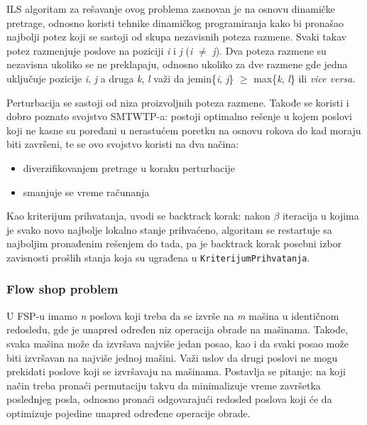 \documentclass[a4paper]{article}
\newcommand{\kriterijum}[0]{\small{\texttt{KriterijumPrihvatanja}}}
\begin{document}
ILS algoritam za rešavanje ovog problema zasnovan je na osnovu dinamičke pretrage, odnosno koristi tehnike dinamičkog programiranja kako bi pronašao najbolji potez koji se sastoji od skupa nezavisnih poteza razmene. Svaki takav potez razmenjuje poslove na poziciji \textit{i} i \textit{j} (\textit{i} $\ne$ \textit{j}). Dva poteza razmene su nezavisna ukoliko se ne preklapaju, odnosno ukoliko za dve razmene gde jedna uključuje pozicije \textit{i}, \textit{j} a druga \textit{k}, \textit{l} važi da je\linebreak min\{\textit{i}, \textit{j}\} $\geq$ max\{\textit{k}, \textit{l}\} ili \textit{vice versa}.

Perturbacija se sastoji od niza proizvoljnih poteza razmene. Takođe se koristi i dobro poznato svojstvo SMTWTP-a: postoji optimalno rešenje u kojem poslovi koji ne kasne su poređani u nerastućem poretku na osnovu rokova do kad moraju biti završeni, te se ovo svojstvo koristi na dva načina:
\begin{itemize}
  \item diverzifikovanjem pretrage u koraku perturbacije
  \item smanjuje se vreme računanja
\end{itemize}
Kao kriterijum prihvatanja, uvodi se backtrack korak: nakon $\beta$ iteracija u kojima je svako novo najbolje lokalno stanje prihvaćeno, algoritam se restartuje sa najboljim pronađenim rešenjem do tada, pa je backtrack korak posebni izbor zavisnosti prošlih stanja koja su ugrađena u \kriterijum. \cite{handbookOfMetaheuristics,designOfIteratedLocalSearchAlgorithms}

\subsubsection{Flow shop problem}
U FSP-u imamo \textit{n} poslova koji treba da se izvrše na \textit{m} mašina u identičnom redosledu, gde je unapred određen niz operacija obrade na mašinama. Takođe, svaka mašina može da izvršava najviše jedan posao, kao i da svaki posao može biti izvršavan na najviše jednoj mašini. Važi uslov da drugi poslovi ne mogu prekidati poslove koji se izvršavaju na mašinama.  Postavlja se pitanje: na koji način treba pronaći permutaciju takvu da minimalizuje
vreme završetka poslednjeg posla, odnosno pronaći odgovarajući redosled poslova koji će da optimizuje pojedine unapred određene operacije obrade.
\end{document}
